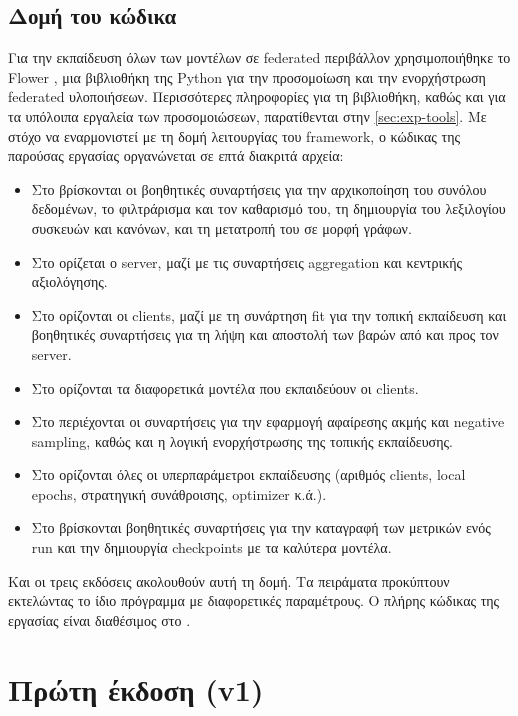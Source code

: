 \subsection{Δομή του κώδικα}\label{ssec:codebase}
Για την εκπαίδευση όλων των μοντέλων σε federated περιβάλλον χρησιμοποιήθηκε το Flower \cite{beutel_flower_2020, flower_software}, μια βιβλιοθήκη της Python για την προσομοίωση και την ενορχήστρωση federated υλοποιήσεων. Περισσότερες πληροφορίες για τη βιβλιοθήκη, καθώς και για τα υπόλοιπα εργαλεία των προσομοιώσεων, παρατίθενται στην \autoref{sec:exp-tools}. Με στόχο να εναρμονιστεί με τη δομή λειτουργίας του framework, ο κώδικας της παρούσας εργασίας οργανώνεται σε επτά διακριτά αρχεία:
\begin{itemize}
    \item Στο  βρίσκονται οι βοηθητικές συναρτήσεις για την αρχικοποίηση του συνόλου δεδομένων, το φιλτράρισμα και τον καθαρισμό του, τη δημιουργία του λεξιλογίου συσκευών και κανόνων, και τη μετατροπή του σε μορφή γράφων.
    \item Στο  ορίζεται ο server, μαζί με τις συναρτήσεις aggregation και κεντρικής αξιολόγησης.
    \item Στο  ορίζονται οι clients, μαζί με τη συνάρτηση fit για την τοπική εκπαίδευση και βοηθητικές συναρτήσεις για τη λήψη και αποστολή των βαρών από και προς τον server.
    \item Στο  ορίζονται τα διαφορετικά μοντέλα που εκπαιδεύουν οι clients.
    \item Στο  περιέχονται οι συναρτήσεις για την εφαρμογή αφαίρεσης ακμής και negative sampling, καθώς και η λογική ενορχήστρωσης της τοπικής εκπαίδευσης.
    \item Στο  ορίζονται όλες οι υπερπαράμετροι εκπαίδευσης (αριθμός clients, local epochs, στρατηγική συνάθροισης, optimizer κ.ά.).
    \item Στο  βρίσκονται βοηθητικές συναρτήσεις για την καταγραφή των μετρικών ενός run και την δημιουργία checkpoints με τα καλύτερα μοντέλα.
\end{itemize}
Και οι τρεις εκδόσεις ακολουθούν αυτή τη δομή. Τα πειράματα προκύπτουν εκτελώντας το ίδιο πρόγραμμα με διαφορετικές παραμέτρους.
Ο πλήρης κώδικας της εργασίας είναι διαθέσιμος στο \cite{politis_code_2026}.

\section{Πρώτη έκδοση (v1)}\label{sec:v1}
